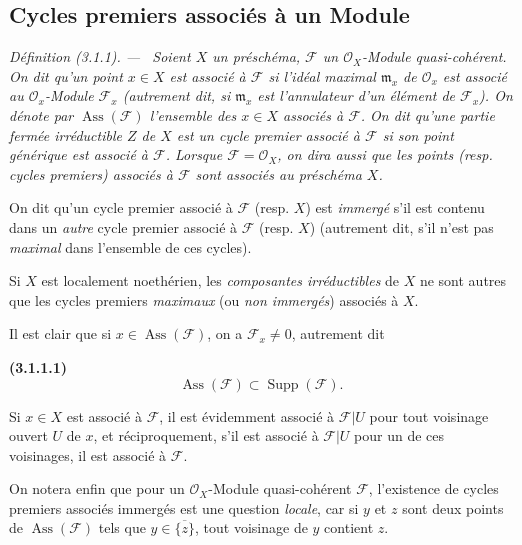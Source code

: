 \documentclass[10pt,oneside]{book}
\newenvironment{env}[1][]{\par\medskip\noindent\textbf{(#1)}\ }{\par}
\newenvironment{definition}[1][]{%
  \par\medskip\noindent\itshape Définition (#1). ---\ }{\par}
\begin{document}
\subsection{Cycles premiers associés à un Module}

\begin{definition}[3.1.1]
\label{IV.2.3.1.1-def-fr}
Soient $X$ un préschéma, $\mathcal F$ un $\mathcal O_X$-Module
quasi-cohérent. On dit qu'un point $x\in X$ est associé à $\mathcal F$ si
l'idéal maximal $\mathfrak m_x$ de $\mathcal O_x$ est associé au
$\mathcal O_x$-Module $\mathcal F_x$ (autrement dit, si $\mathfrak m_x$ est
l'annulateur d'un élément de $\mathcal F_x$). On dénote par
$\operatorname{Ass}(\mathcal F)$ l'ensemble des $x\in X$ associés à
$\mathcal F$. On dit qu'une partie fermée irréductible $Z$ de $X$ est un
\emph{cycle premier associé à $\mathcal F$} si son point générique est
associé à $\mathcal F$. Lorsque $\mathcal F=\mathcal O_X$, on dira aussi que
les points (resp. \emph{cycles premiers}) associés à $\mathcal F$ sont
associés au préschéma $X$.

On dit qu'un cycle premier associé à $\mathcal F$ (resp. $X$) est
\emph{immergé} s'il est contenu dans un \emph{autre} cycle premier associé à
$\mathcal F$ (resp. $X$) (autrement dit, s'il n'est pas \emph{maximal} dans
l'ensemble de ces cycles).
\end{definition}

Si $X$ est localement noethérien, les \emph{composantes irréductibles} de $X$
ne sont autres que les cycles premiers \emph{maximaux} (ou \emph{non immergés})
associés à $X$.

Il est clair que si $x\in\operatorname{Ass}(\mathcal F)$, on a
$\mathcal F_x\ne0$, autrement dit

\begin{env}[3.1.1.1]
\label{IV.2.3.1.1.1-fr}
\[
\operatorname{Ass}(\mathcal F)\subset\operatorname{Supp}(\mathcal F).
\]
\end{env}

Si $x\in X$ est associé à $\mathcal F$, il est évidemment associé à
$\mathcal F|U$ pour tout voisinage ouvert $U$ de $x$, et réciproquement, s'il
est associé à $\mathcal F|U$ pour un de ces voisinages, il est associé à
$\mathcal F$.

On notera enfin que pour un $\mathcal O_X$-Module quasi-cohérent $\mathcal F$,
l'existence de cycles premiers associés immergés est une question \emph{locale},
car si $y$ et $z$ sont deux points de $\operatorname{Ass}(\mathcal F)$ tels
que $y\in\overline{\{z\}}$, tout voisinage de $y$ contient $z$.
\end{document}
